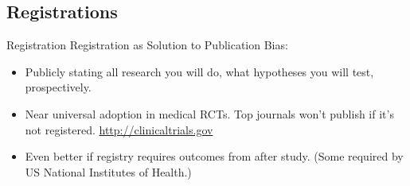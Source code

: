 \documentclass[aspectratio=169]{beamer}
\begin{document}
\subsection*{Registrations}
\begin{frame}{Registration}
Registration as Solution to Publication Bias:
 \begin{itemize}
  \item
   Publicly stating all research you will do, what hypotheses you will test, prospectively.
  \item
   Near universal adoption in medical RCTs. Top journals won't publish if it's not registered. \url{http://clinicaltrials.gov}
\item
   Even better if registry requires outcomes from after study. (Some required by US National Institutes of Health.)
\end{itemize}
\end{frame}
\end{document}
